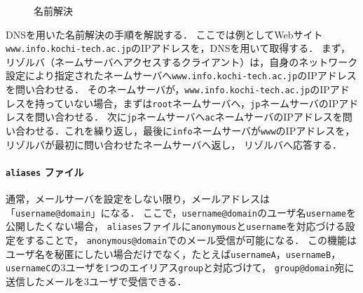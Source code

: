 \begin{wrapfigure}{r}[0mm]{.45\textwidth}
    \centering
    
    \caption{名前解決}
    \vspace{-.5cm}
\end{wrapfigure}
DNSを用いた名前解決の手順を解説する．
ここでは例としてWebサイト\texttt{www.info.kochi-tech.ac.jp}のIPアドレスを，DNSを用いて取得する．
まず，リゾルバ（ネームサーバへアクセスするクライアント）は，自身のネットワーク設定により指定されたネームサーバへ\texttt{www.info.kochi-tech.ac.jp}のIPアドレスを問い合わせる．
そのネームサーバが，\texttt{www.info.kochi-tech.ac.jp}のIPアドレスを持っていない場合，まずは\texttt{root}ネームサーバへ，\texttt{jp}ネームサーバのIPアドレスを問い合わせる．
次に\texttt{jp}ネームサーバへ\texttt{ac}ネームサーバのIPアドレスを問い合わせる．これを繰り返し，最後に\texttt{info}ネームサーバが\texttt{www}のIPアドレスを，リゾルバが最初に問い合わせたネームサーバへ返し，
リゾルバへ応答する．\hfill\cite[p.8]{DNSBIND}
\newcommand{\aliases}{\texttt{aliases}}
\newcommand{\user}{ユーザ}
\paragraph{\texttt{\bfseries aliases} ファイル}
通常，メールサーバを設定をしない限り，メールアドレスは「\texttt{username@domain}」になる．
ここで，\texttt{username@domain}の\user 名\texttt{username}を公開したくない場合，
\aliases ファイルに\texttt{anonymous}と\texttt{username}を対応づける設定をすることで，
\texttt{anonymous@domain}でのメール受信が可能になる．
この機能は\user 名を秘匿にしたい場合だけでなく，たとえば\texttt{usernameA}，\texttt{usernameB}，\texttt{usernameC}の3\user を1つのエイリアス\texttt{group}と対応づけて，
\texttt{group@domain}宛に送信したメールを3\user で受信できる．